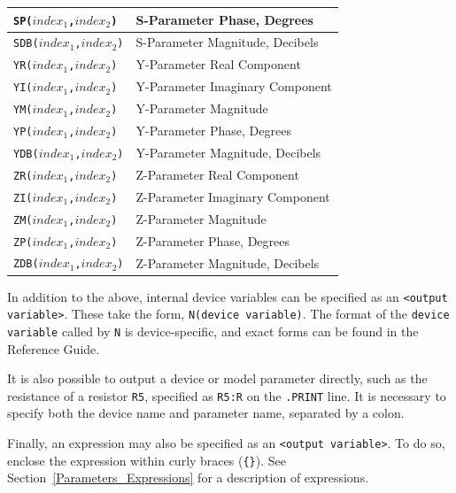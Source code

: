 \begin{table}[!htb]
\begin{tabularx}{\linewidth}{|Y|Y|}
    \texttt{SP($index_1$,$index_2$)} & S-Parameter Phase, Degrees \\ \hline
    \texttt{SDB($index_1$,$index_2$)} & S-Parameter Magnitude, Decibels \\ \hline
    \texttt{YR($index_1$,$index_2$)} & Y-Parameter Real Component \\ \hline
    \texttt{YI($index_1$,$index_2$)} & Y-Parameter Imaginary Component \\ \hline
    \texttt{YM($index_1$,$index_2$)} & Y-Parameter Magnitude \\ \hline
    \texttt{YP($index_1$,$index_2$)} & Y-Parameter Phase, Degrees \\ \hline
    \texttt{YDB($index_1$,$index_2$)} & Y-Parameter Magnitude, Decibels \\ \hline
    \texttt{ZR($index_1$,$index_2$)} & Z-Parameter Real Component \\ \hline
    \texttt{ZI($index_1$,$index_2$)} & Z-Parameter Imaginary Component \\ \hline
    \texttt{ZM($index_1$,$index_2$)} & Z-Parameter Magnitude \\ \hline
    \texttt{ZP($index_1$,$index_2$)} & Z-Parameter Phase, Degrees \\ \hline
    \texttt{ZDB($index_1$,$index_2$)} & Z-Parameter Magnitude, Decibels
  \end{tabularx}
\end{table}

In addition to the above, internal device variables can be specified as an
\texttt{<output variable>}.  These take the form, \texttt{N(device variable)}.
The format of the \texttt{device variable} called by \texttt{N} is
device-specific, and exact forms can be found in the \Xyce{} Reference
Guide\ReferenceGuide{}.

It is also possible to output a device or model parameter directly, such as 
the resistance of a resistor \texttt{R5}, specified as \texttt{R5:R} on the \texttt{.PRINT} line.
It is necessary to specify both the device name and parameter name,
separated by a colon.

Finally, an expression may also be specified as an \texttt{<output
variable>}. To do so, enclose the expression within curly braces
(\texttt{\{\}}).  See Section~\ref{Parameters_Expressions} for a description of
expressions.


